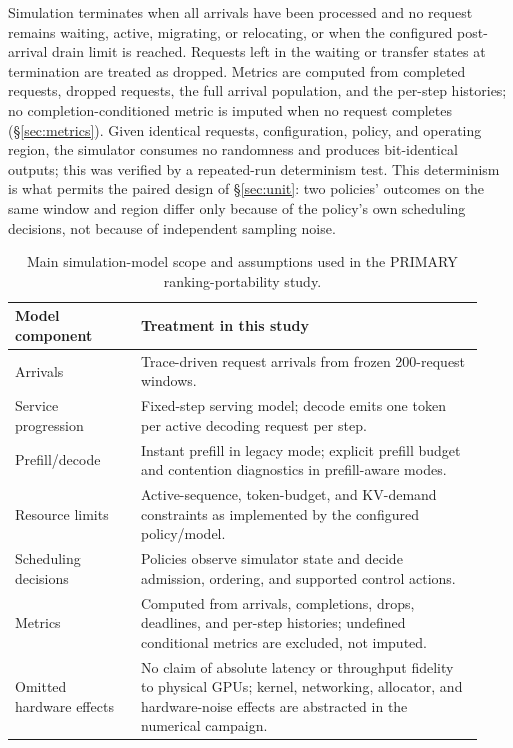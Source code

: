 Simulation terminates when all arrivals have been processed and no request
remains waiting, active, migrating, or relocating, or when the configured
post-arrival drain limit is reached. Requests left in the waiting or
transfer states at termination are treated as dropped. Metrics are computed
from completed requests, dropped requests, the full arrival population, and
the per-step histories; no completion-conditioned metric is imputed when no
request completes (\S\ref{sec:metrics}). Given identical requests,
configuration, policy, and operating region, the simulator consumes no
randomness and produces bit-identical outputs; this was verified by a
repeated-run determinism test. This determinism is what permits the paired
design of \S\ref{sec:unit}: two policies' outcomes on the same window and
region differ only because of the policy's own scheduling decisions, not
because of independent sampling noise.

\begin{table}[t]
\centering
\caption{Main simulation-model scope and assumptions used in the PRIMARY
ranking-portability study.}
\label{tab:model-assumptions}
\small
\begin{tabular}{p{0.25\linewidth}p{0.68\linewidth}}
\toprule
Model component & Treatment in this study \\
\midrule
Arrivals & Trace-driven request arrivals from frozen 200-request windows. \\
Service progression & Fixed-step serving model; decode emits one token per active decoding request per step. \\
Prefill/decode & Instant prefill in legacy mode; explicit prefill budget and contention diagnostics in prefill-aware modes. \\
Resource limits & Active-sequence, token-budget, and KV-demand constraints as implemented by the configured policy/model. \\
Scheduling decisions & Policies observe simulator state and decide admission, ordering, and supported control actions. \\
Metrics & Computed from arrivals, completions, drops, deadlines, and per-step histories; undefined conditional metrics are excluded, not imputed. \\
Omitted hardware effects & No claim of absolute latency or throughput fidelity to physical GPUs; kernel, networking, allocator, and hardware-noise effects are abstracted in the numerical campaign. \\
\bottomrule
\end{tabular}
\end{table}


